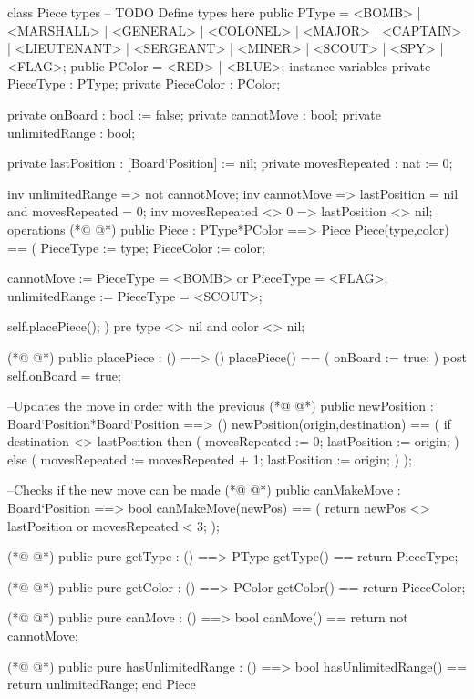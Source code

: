 \begin{vdmpp}[breaklines=true]
class Piece
types
-- TODO Define types here
   public PType = <BOMB> | <MARSHALL> | <GENERAL> | <COLONEL> | <MAJOR> | <CAPTAIN> | <LIEUTENANT> | <SERGEANT> | <MINER> | <SCOUT> | <SPY> | <FLAG>;
  public PColor = <RED> | <BLUE>;
instance variables
  private PieceType : PType;
  private PieceColor : PColor;
  
  private onBoard : bool := false;
  private cannotMove : bool;
  private unlimitedRange : bool;
     
   private lastPosition : [Board`Position] := nil;
   private movesRepeated : nat := 0;
   
   inv unlimitedRange => not cannotMove;
   inv cannotMove => lastPosition = nil and movesRepeated = 0;
   inv movesRepeated <> 0 => lastPosition <> nil;
operations
(*@
\label{Piece:21}
@*)
  public Piece : PType*PColor ==> Piece
    Piece(type,color) ==
    (
     PieceType := type;
     PieceColor := color;
     
     cannotMove := PieceType = <BOMB> or PieceType = <FLAG>;
     unlimitedRange := PieceType = <SCOUT>;
     
     self.placePiece();
    )
    pre type <> nil and color <> nil;
   
(*@
\label{placePiece:34}
@*)
    public placePiece : () ==> ()
    placePiece() ==
    (
     onBoard := true;
    )
    post self.onBoard = true;
    
    --Updates the move in order with the previous
(*@
\label{newPosition:42}
@*)
    public newPosition : Board`Position*Board`Position  ==> ()
    newPosition(origin,destination) == 
    (
     if destination <> lastPosition then
     (
       movesRepeated := 0;
       lastPosition := origin;
     )
     else 
     (
      movesRepeated := movesRepeated + 1;
      lastPosition := origin;
     )
    );
    
    --Checks if the new move can be made
(*@
\label{canMakeMove:58}
@*)
    public canMakeMove : Board`Position ==> bool
    canMakeMove(newPos) == 
    (
     return newPos <> lastPosition or movesRepeated < 3;
    );
    
(*@
\label{getType:64}
@*)
    public pure getType : () ==> PType
    getType() == return PieceType;
    
(*@
\label{getColor:67}
@*)
    public pure getColor : () ==> PColor
    getColor() == return PieceColor;
    
(*@
\label{canMove:70}
@*)
    public pure canMove : () ==> bool
    canMove() == return not cannotMove;
    
(*@
\label{hasUnlimitedRange:73}
@*)
    public pure hasUnlimitedRange : () ==> bool
    hasUnlimitedRange() == return unlimitedRange;
end Piece
\end{vdmpp}
